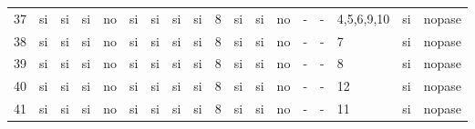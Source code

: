 \documentclass[a4paper, 10pt, notitlepage]{article}
\begin{document}
\begin{landscape}
\begin{tabularx}{1.6\textheight}{|X|X|X|X|X|X|X|X|X|X|X|X|X|X|X|X|X|X|}
37	&	si	&	si	&	si	&	no	&	si	&	si	&	si	&	si	&	8	&	si	&	si	&	no	&	-	&	-	&	4,5,6,9,10	&	si	&	nopase\\
38	&	si	&	si	&	si	&	no	&	si	&	si	&	si	&	si	&	8	&	si	&	si	&	no	&	-	&	-	&	7	&	si	&	nopase\\
39	&	si	&	si	&	si	&	no	&	si	&	si	&	si	&	si	&	8	&	si	&	si	&	no	&	-	&	-	&	8	&	si	&	nopase\\
40	&	si	&	si	&	si	&	no	&	si	&	si	&	si	&	si	&	8	&	si	&	si	&	no	&	-	&	-	&	12	&	si	&	nopase\\
41	&	si	&	si	&	si	&	no	&	si	&	si	&	si	&	si	&	8	&	si	&	si	&	no	&	-	&	-	&	11	&	si	&	nopase\\
\hline	
\end{tabularx}
\vskip3cm


\end{landscape}



	\newpage
	
	
\end{document}
